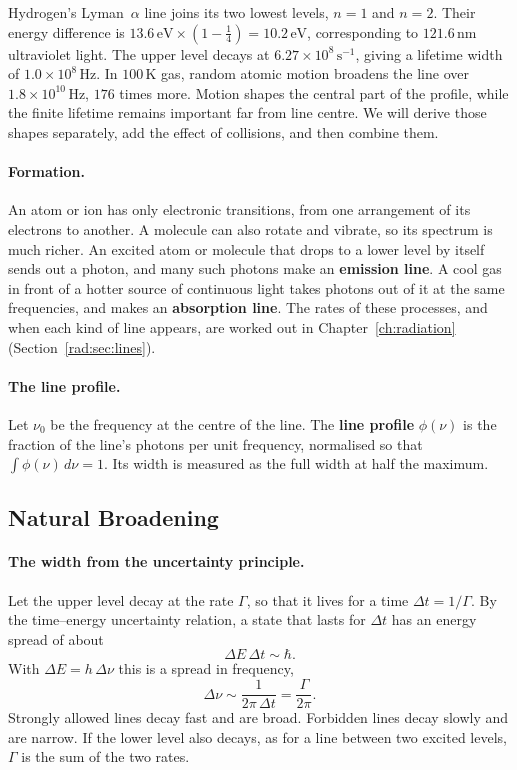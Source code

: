Hydrogen's Lyman~$\alpha$ line joins its two lowest levels, $n=1$ and $n=2$. Their energy difference is $13.6\,\mathrm{eV}\times(1-\tfrac14)=10.2\,\mathrm{eV}$, corresponding to $121.6\,\mathrm{nm}$ ultraviolet light. The upper level decays at $6.27\times10^8\,\mathrm{s^{-1}}$, giving a lifetime width of $1.0\times10^8\,\mathrm{Hz}$. In $100\,\mathrm K$ gas, random atomic motion broadens the line over $1.8\times10^{10}\,\mathrm{Hz}$, $176$ times more. Motion shapes the central part of the profile, while the finite lifetime remains important far from line centre. We will derive those shapes separately, add the effect of collisions, and then combine them.

\paragraph{Formation.} An atom or ion has only electronic transitions, from one arrangement of its electrons to another. A molecule can also rotate and vibrate, so its spectrum is much richer. An excited atom or molecule that drops to a lower level by itself sends out a photon, and many such photons make an \textbf{emission line}. A cool gas in front of a hotter source of continuous light takes photons out of it at the same frequencies, and makes an \textbf{absorption line}. The rates of these processes, and when each kind of line appears, are worked out in Chapter~\ref{ch:radiation} (Section~\ref{rad:sec:lines}).

\paragraph{The line profile.} Let $\nu_0$ be the frequency at the centre of the line. The \textbf{line profile} $\phi(\nu)$ is the fraction of the line's photons per unit frequency, normalised so that $\int\phi(\nu)\,d\nu=1$. Its width is measured as the full width at half the maximum.

\subsection{Natural Broadening}

\paragraph{The width from the uncertainty principle.} Let the upper level decay at the rate $\Gamma$, so that it lives for a time $\Delta t=1/\Gamma$. By the time--energy uncertainty relation, a state that lasts for $\Delta t$ has an energy spread of about
\begin{equation}
	\Delta E\,\Delta t \sim \hbar.
	\label{eq:natural_broadening_energy}
\end{equation}
With $\Delta E=h\,\Delta\nu$ this is a spread in frequency,
\begin{equation}
	\Delta\nu \sim \frac{1}{2\pi\,\Delta t}=\frac{\Gamma}{2\pi}.
	\label{eq:natural_broadening_freq}
\end{equation}
Strongly allowed lines decay fast and are broad. Forbidden lines decay slowly and are narrow. If the lower level also decays, as for a line between two excited levels, $\Gamma$ is the sum of the two rates.


